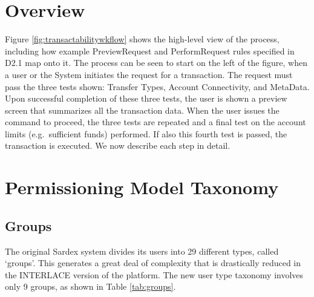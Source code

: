 \section{Overview}
Figure \ref{fig:transactabilitywkflow} shows the high-level view of the process, including how example PreviewRequest and PerformRequest rules specified in D2.1 map onto it. The process can be seen to start on the left of the figure, when a user or the System initiates the request for a transaction. The request must pass the three tests shown: Transfer Types, Account Connectivity, and MetaData. Upon successful completion of these three tests, the user is shown a preview screen that summarizes all the transaction data. When the user issues the command to proceed, the three tests are repeated and a final test on the account limits (e.g.\ sufficient funds) performed. If also this fourth test is passed, the transaction is executed. We now describe each step in detail.

\section{Permissioning Model Taxonomy}
\subsection{Groups}
The original Sardex system divides its users into 29 different types, called `groups'. This generates a great deal of complexity that is drastically reduced in the INTERLACE version of the platform. The new user type taxonomy involves only 9 groups, as shown in Table \ref{tab:groups}.

